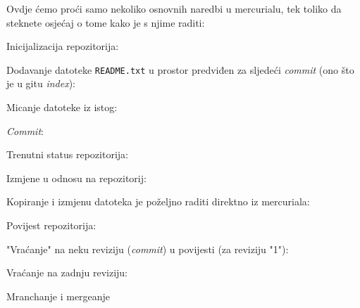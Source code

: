 Ovdje ćemo proći samo nekoliko osnovnih naredbi u mercurialu, tek toliko da steknete osjećaj o tome kako je s njime raditi:

Inicijalizacija repozitorija:


Dodavanje datoteke \verb+README.txt+ u prostor predviđen za sljedeći \emph{commit} (ono što je u gitu \emph{index}):


Micanje datoteke iz istog:


\emph{Commit}:


Trenutni status repozitorija:


Izmjene u odnosu na repozitorij:


Kopiranje i izmjenu datoteka je poželjno raditi direktno iz mercuriala:


Povijest repozitorija:


"Vraćanje" na neku reviziju (\emph{commit}) u povijesti (za reviziju "1"):


Vraćanje na zadnju reviziju:


\TODO Mranchanje i mergeanje

